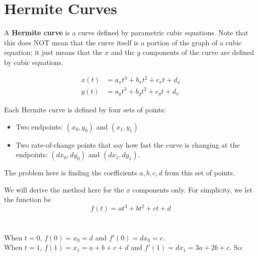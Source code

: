 \documentclass[12pt]{article}
\begin{document}
\section{Hermite Curves}
A \textbf{Hermite curve} is a curve defined by parametric cubic equations. Note that this does NOT mean that the curve itself is a portion of the graph of a cubic equation; it just means that the $x$ and the $y$ components of the curve are defined by cubic equations.

\[
\begin{aligned}
  x(t) &= a_xt^3 + b_xt^2 + c_xt + d_x \\
  y(t) &= a_yt^3 + b_yt^2 + c_yt + d_x
\end{aligned}
\]

Each Hermite curve is defined by four sets of points: 
\begin{itemize}
\item Two endpoints: $(x_0,y_0)$ and $(x_1,y_1)$
\item Two rate-of-change points that say how fast the curve is changing at the endpoints: $(dx_0,dy_0)$ and $(dx_1,dy_1)$.
\end{itemize}

The problem here is finding the coefficients $a,b,c,d$ from this set of points. 

We will derive the method here for the $x$ components only. For simplicity, we let the function be \[ f(t) = at^3 + bt^2 + ct + d \] \\ \\
When $t=0$, $f(0) = x_0 = d$ and $f'(0) = dx_0 = c$. \\
When $t=1$, $f(1) = x_1 = a+b+c+d$ and $f'(1) = dx_1 = 3a + 2b + c$. So:
\end{document}
